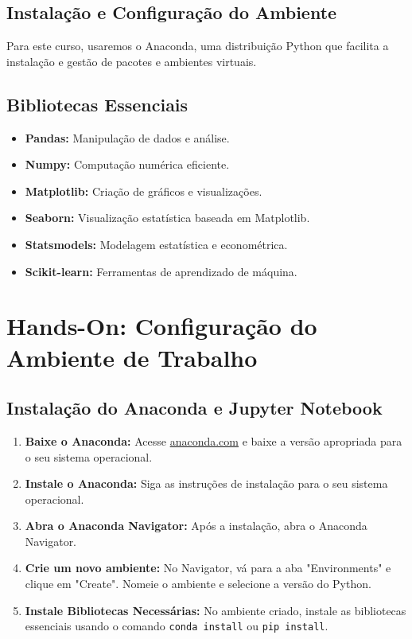 \subsection{Instalação e Configuração do Ambiente}
Para este curso, usaremos o Anaconda, uma distribuição Python que facilita a instalação e gestão de pacotes e ambientes virtuais.

\subsection{Bibliotecas Essenciais}
\begin{itemize}
    \item \textbf{Pandas:} Manipulação de dados e análise.
    \item \textbf{Numpy:} Computação numérica eficiente.
    \item \textbf{Matplotlib:} Criação de gráficos e visualizações.
    \item \textbf{Seaborn:} Visualização estatística baseada em Matplotlib.
    \item \textbf{Statsmodels:} Modelagem estatística e econométrica.
    \item \textbf{Scikit-learn:} Ferramentas de aprendizado de máquina.
\end{itemize}

\section{Hands-On: Configuração do Ambiente de Trabalho}

\subsection{Instalação do Anaconda e Jupyter Notebook}
\begin{enumerate}
    \item \textbf{Baixe o Anaconda:}
    Acesse \href{https://www.anaconda.com/products/individual}{anaconda.com} e baixe a versão apropriada para o seu sistema operacional.
    \item \textbf{Instale o Anaconda:}
    Siga as instruções de instalação para o seu sistema operacional.
    \item \textbf{Abra o Anaconda Navigator:}
    Após a instalação, abra o Anaconda Navigator.
    \item \textbf{Crie um novo ambiente:}
    No Navigator, vá para a aba "Environments" e clique em "Create". Nomeie o ambiente e selecione a versão do Python.
    \item \textbf{Instale Bibliotecas Necessárias:}
    No ambiente criado, instale as bibliotecas essenciais usando o comando \texttt{conda install} ou \texttt{pip install}.
\end{enumerate}

